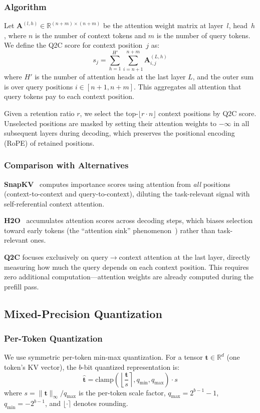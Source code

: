 \documentclass[conference]{IEEEtran}
\newcommand{\QtoC}{\textsc{Q2C}\xspace}
\newcommand{\R}{\mathbb{R}}
\newcommand{\bA}{\mathbf{A}}
\begin{document}
\subsubsection{Algorithm}
Let $\bA^{(l,h)} \in \R^{(n+m) \times (n+m)}$ be the attention weight matrix at layer~$l$, head~$h$, where $n$ is the number of context tokens and $m$ is the number of query tokens.
We define the \QtoC score for context position~$j$ as:
\begin{equation}
    s_j = \sum_{h=1}^{H'} \sum_{i=n+1}^{n+m} \bA^{(L,h)}_{i,j}
    \label{eq:q2c_score}
\end{equation}
where $H'$ is the number of attention heads at the last layer $L$, and the outer sum is over query positions $i \in [n+1, n+m]$.
This aggregates all attention that query tokens pay to each context position.

Given a retention ratio $r$, we select the top-$\lfloor r \cdot n \rfloor$ context positions by \QtoC score.
Unselected positions are masked by setting their attention weights to $-\infty$ in all subsequent layers during decoding, which preserves the positional encoding (RoPE) of retained positions.

\subsubsection{Comparison with Alternatives}

\textbf{SnapKV}~\cite{snapkv} computes importance scores using attention from \emph{all} positions (context-to-context and query-to-context), diluting the task-relevant signal with self-referential context attention.

\textbf{H2O}~\cite{h2o} accumulates attention scores across decoding steps, which biases selection toward early tokens (the ``attention sink'' phenomenon~\cite{streamingllm}) rather than task-relevant ones.

\textbf{\QtoC} focuses exclusively on query$\to$context attention at the last layer, directly measuring how much the query depends on each context position. This requires zero additional computation---attention weights are already computed during the prefill pass.

\subsection{Mixed-Precision Quantization}
\label{sec:mixed_prec}

\subsubsection{Per-Token Quantization}
We use symmetric per-token min-max quantization.
For a tensor $\mathbf{t} \in \R^d$ (one token's KV vector), the $b$-bit quantized representation is:
\begin{equation}
    \hat{\mathbf{t}} = \text{clamp}\!\left(\left\lfloor \frac{\mathbf{t}}{s} \right\rceil, q_{\min}, q_{\max}\right) \cdot s
\end{equation}
where $s = \|\mathbf{t}\|_\infty / q_{\max}$ is the per-token scale factor, $q_{\max} = 2^{b-1}-1$, $q_{\min} = -2^{b-1}$, and $\lfloor \cdot \rceil$ denotes rounding.
\end{document}
